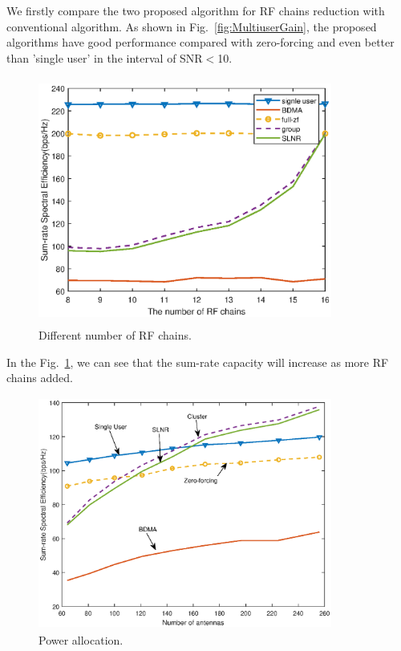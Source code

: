 \documentclass[conference]{IEEEtran}
\begin{document}
We firstly compare the two proposed algorithm for RF chains reduction with conventional algorithm. As shown in Fig.~\ref{fig:MultiuserGain}, the proposed algorithms have good performance compared with zero-forcing and even better than 'single user' in the interval of SNR$<$10.


\begin{figure}[ht]
	\begin{center}
		\includegraphics[width=3.8in,height=3.2in]{Figure/NRFChains.eps}
		\caption{Different number of RF chains.}\label{fig:RFchains}
	\end{center}
\end{figure}
In the Fig.~\ref{fig:RFchains}, we can see that the sum-rate capacity will increase as more RF chains added.


\begin{figure}[ht]
	\begin{center}
		\includegraphics[width=3.8in,height=3in]{Figure/antenna.eps}
		\caption{Power allocation.}\label{fig:CDF}
	\end{center}
\end{figure}
\end{document}
